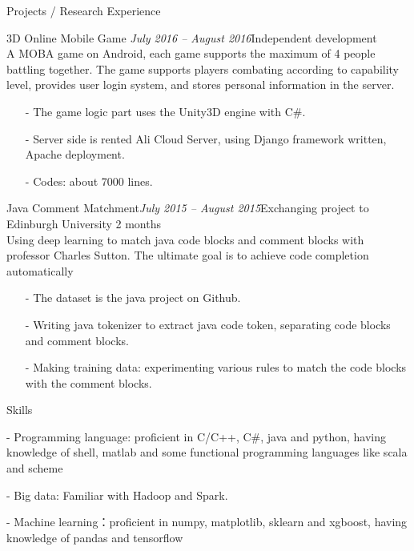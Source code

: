 \documentclass{resume} %
\begin{document}
\begin{rSection}{Projects / Research Experience}
\begin{rSubsection}{3D Online Mobile Game }{\em July 2016 – August 2016}{Independent development \\}
{A MOBA game on Android, each game supports the maximum of 4 people battling together. The game supports
players combating according to capability level, provides user login system, and stores personal information in
the server.}
\item[]
\begin{itemize}
\setlength\itemsep{-0.5em}
\item[-] The game logic part uses the Unity3D engine with C\#.
\item[-] Server side is rented Ali Cloud Server, using Django framework written, Apache deployment.
\item[-] Codes: about 7000 lines.
\end{itemize}
\end{rSubsection}

\begin{rSubsection}{Java Comment Matchment}{\em July 2015 – August 2015}{Exchanging project to Edinburgh University 2 months \\}
{Using deep learning to match java code blocks and comment blocks with professor Charles Sutton. The ultimate
goal is to achieve code completion automatically}
\item[]
\begin{itemize}
\setlength\itemsep{-0.5em}
\item[-] The dataset is the java project on Github.
\item[-] Writing java tokenizer to extract java code token, separating code blocks and comment blocks.
\item[-] Making training data: experimenting various rules to match the code blocks with the comment blocks.
\end{itemize}
\end{rSubsection}

\end{rSection}


\begin{rSection}{Skills}
\begin{rSubsection}
{}{}{}{}
\item[-] Programming language: proficient in C/C++, C\#, java and python, having knowledge of shell, matlab and some
functional programming languages like scala and scheme
\item[-] Big data: Familiar with Hadoop and Spark.
\item[-] Machine learning：proficient in numpy, matplotlib, sklearn and xgboost, having knowledge of pandas and
tensorflow
\end{rSubsection}
\end{rSection}
\end{document}
